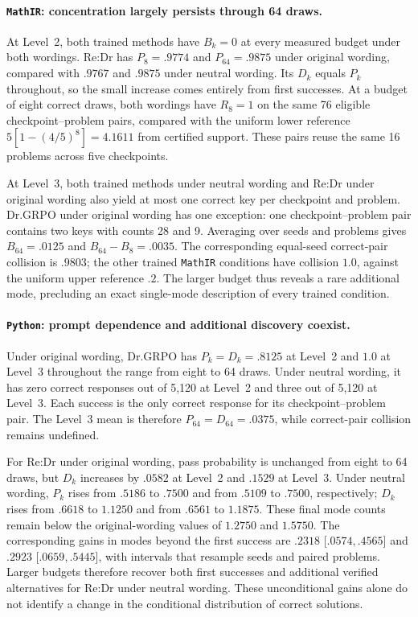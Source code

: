 \paragraph{\texttt{MathIR}: concentration largely persists through 64 draws.}
At Level~2, both trained methods have $B_k=0$ at every measured budget under
both wordings. Re:Dr has $P_8=.9774$ and $P_{64}=.9875$ under original
wording, compared with $.9767$ and $.9875$ under neutral wording. Its $D_k$
equals $P_k$ throughout, so the small increase comes entirely from first
successes. At a budget of eight correct draws, both wordings have $R_8=1$
on the same 76 eligible checkpoint--problem pairs, compared with the
uniform lower reference $5[1-(4/5)^8]=4.1611$ from certified support.
These pairs reuse the same 16 problems across five checkpoints.

At Level~3, both trained methods under neutral wording and Re:Dr under
original wording also yield at most one correct key per checkpoint and
problem. Dr.GRPO under original wording has one exception: one checkpoint--problem
pair contains two keys with counts 28 and 9. Averaging over seeds and problems
gives $B_{64}=.0125$ and $B_{64}-B_8=.0035$. The corresponding equal-seed
correct-pair collision is $.9803$; the other trained \texttt{MathIR}
conditions have collision $1.0$, against the uniform upper reference $.2$.
The larger budget thus reveals a rare additional mode, precluding an exact
single-mode description of every trained condition.

\paragraph{\texttt{Python}: prompt dependence and additional discovery coexist.}
Under original wording, Dr.GRPO has $P_k=D_k=.8125$ at Level~2 and $1.0$
at Level~3 throughout the range from eight to 64 draws. Under neutral wording,
it has zero correct responses out of 5,120 at Level~2 and three out of
5,120 at Level~3. Each success is the only correct response for its
checkpoint--problem pair. The Level~3 mean is therefore
$P_{64}=D_{64}=.0375$, while correct-pair collision remains undefined.

For Re:Dr under original wording, pass probability is unchanged from eight
to 64 draws, but $D_k$ increases by $.0582$ at Level~2 and $.1529$ at
Level~3. Under neutral wording, $P_k$ rises from $.5186$ to $.7500$ and
from $.5109$ to $.7500$, respectively; $D_k$ rises from $.6618$ to $1.1250$
and from $.6561$ to $1.1875$. These final mode counts remain below the
original-wording values of $1.2750$ and $1.5750$. The corresponding gains
in modes beyond the first success are $.2318$ [$.0574,.4565$] and $.2923$
[$.0659,.5445$], with intervals that resample seeds and paired problems.
Larger budgets therefore recover both first successes and additional
verified alternatives for Re:Dr under neutral wording. These unconditional
gains alone do not identify a change in the conditional distribution of
correct solutions.

